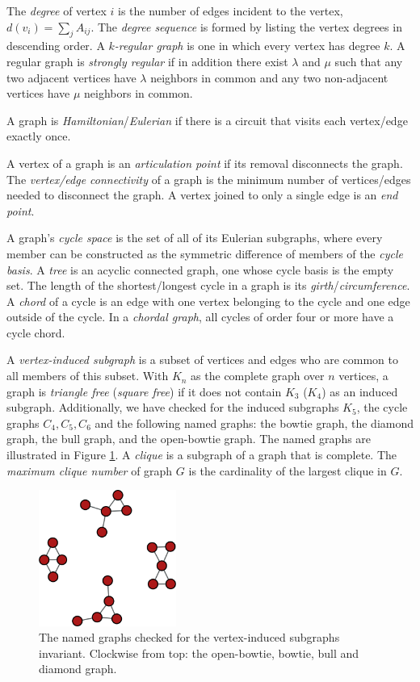 \documentclass[12pt]{article}
\begin{document}
\begin{appendices}
The \textit{degree} of vertex $i$ is the number of edges incident to the vertex, $d(v_i) = \sum_j A_{ij}$. 
The \textit{degree sequence} is formed by listing the vertex degrees in descending order.  
A \textit{$k$-regular graph} is one in which every vertex has degree $k$. 
A regular graph is \textit{strongly regular} if in addition there exist $\lambda$ and $\mu$ such that any two adjacent vertices have $\lambda$ neighbors in common and any two non-adjacent vertices have $\mu$ neighbors in common. 

A graph is \textit{Hamiltonian}/\textit{Eulerian} if there is a circuit that visits each vertex/edge exactly once.

A vertex of a graph is an \textit{articulation point} if its removal disconnects the graph. 
The \textit{vertex/edge connectivity} of a graph is the minimum number of vertices/edges needed to disconnect the graph.
A vertex joined to only a single edge is an \textit{end point}.

A graph's \textit{cycle space} is the set of all of its Eulerian subgraphs, where every member can be constructed as the symmetric difference of members of the \textit{cycle basis}. 
A \textit{tree} is an acyclic connected graph, one whose cycle basis is the empty set.
The length of the shortest/longest cycle in a graph is its \textit{girth}/\textit{circumference}.
A \textit{chord} of a cycle is an edge with one vertex belonging to the cycle and one edge outside of the cycle.
In a \textit{chordal graph}, all cycles of order four or more have a cycle chord.   
 
A \textit{vertex-induced subgraph} is a subset of vertices and edges who are common to all members of this subset. 
With $K_n$ as the complete graph over $n$ vertices, a graph is \textit{triangle free} (\textit{square free}) if it does not contain $K_3$ ($K_4$) as an induced subgraph.
Additionally, we have checked for the induced subgraphs $K_5$, the cycle graphs $C_4, C_5, C_6$ and the following named graphs: the bowtie graph, the diamond graph, the bull graph, and the open-bowtie graph. 
The named graphs are illustrated in Figure \ref{fig:namedgraphs}. 
A \textit{clique} is a subgraph of a graph that is complete. 
The \textit{maximum clique number} of graph $G$ is the cardinality of the largest clique in $G$. 

\begin{figure}[h]
  \label{fig:namedgraphs}
  \includegraphics[width=0.4\textwidth]{simple_drawings/combined_subgraphs.png}
  \caption{The named graphs checked for the vertex-induced subgraphs invariant. Clockwise from top: the open-bowtie, bowtie, bull and diamond graph.}
\end{figure}


\end{appendices}
\end{document}
